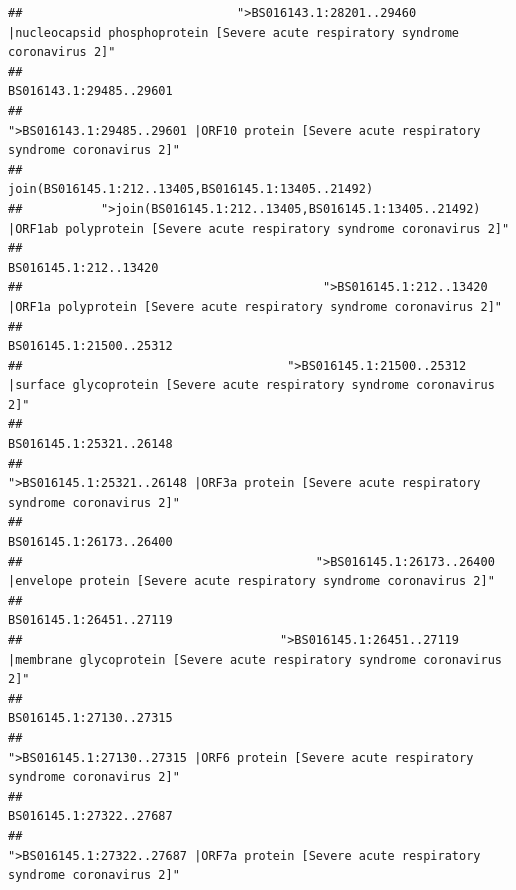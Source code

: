 \documentclass[
]{article}
\begin{document}
\begin{verbatim}
##                              ">BS016143.1:28201..29460 |nucleocapsid phosphoprotein [Severe acute respiratory syndrome coronavirus 2]" 
##                                                                                                                BS016143.1:29485..29601 
##                                            ">BS016143.1:29485..29601 |ORF10 protein [Severe acute respiratory syndrome coronavirus 2]" 
##                                                                                    join(BS016145.1:212..13405,BS016145.1:13405..21492) 
##           ">join(BS016145.1:212..13405,BS016145.1:13405..21492) |ORF1ab polyprotein [Severe acute respiratory syndrome coronavirus 2]" 
##                                                                                                                  BS016145.1:212..13420 
##                                          ">BS016145.1:212..13420 |ORF1a polyprotein [Severe acute respiratory syndrome coronavirus 2]" 
##                                                                                                                BS016145.1:21500..25312 
##                                     ">BS016145.1:21500..25312 |surface glycoprotein [Severe acute respiratory syndrome coronavirus 2]" 
##                                                                                                                BS016145.1:25321..26148 
##                                            ">BS016145.1:25321..26148 |ORF3a protein [Severe acute respiratory syndrome coronavirus 2]" 
##                                                                                                                BS016145.1:26173..26400 
##                                         ">BS016145.1:26173..26400 |envelope protein [Severe acute respiratory syndrome coronavirus 2]" 
##                                                                                                                BS016145.1:26451..27119 
##                                    ">BS016145.1:26451..27119 |membrane glycoprotein [Severe acute respiratory syndrome coronavirus 2]" 
##                                                                                                                BS016145.1:27130..27315 
##                                             ">BS016145.1:27130..27315 |ORF6 protein [Severe acute respiratory syndrome coronavirus 2]" 
##                                                                                                                BS016145.1:27322..27687 
##                                            ">BS016145.1:27322..27687 |ORF7a protein [Severe acute respiratory syndrome coronavirus 2]" 

\end{verbatim}
\end{document}
